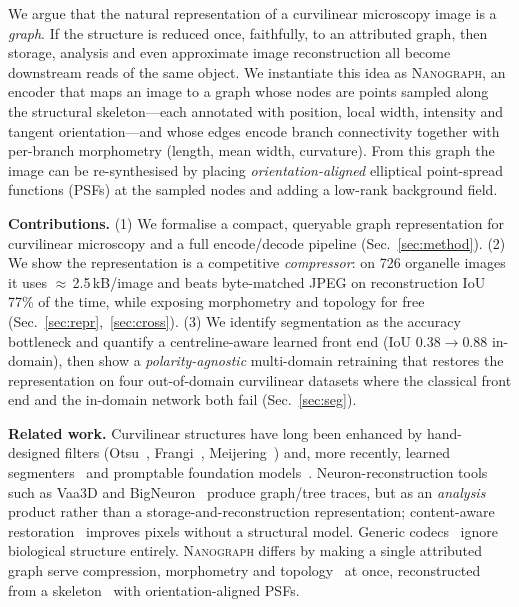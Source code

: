 \documentclass[runningheads]{llncs}
\newcommand{\method}{\textsc{Nanograph}\xspace}
\begin{document}
We argue that the natural representation of a curvilinear microscopy image is a
\emph{graph}. If the structure is reduced once, faithfully, to an attributed
graph, then storage, analysis and even approximate image reconstruction all
become downstream reads of the same object. We instantiate this idea as
\method, an encoder that maps an image to a graph whose nodes are points sampled
along the structural skeleton---each annotated with position, local width,
intensity and tangent orientation---and whose edges encode branch connectivity
together with per-branch morphometry (length, mean width, curvature). From this
graph the image can be re-synthesised by placing \emph{orientation-aligned}
elliptical point-spread functions (PSFs) at the sampled nodes and adding a
low-rank background field.

\noindent\textbf{Contributions.}
(1) We formalise a compact, queryable graph representation for curvilinear
microscopy and a full encode/decode pipeline (Sec.~\ref{sec:method}).
(2) We show the representation is a competitive \emph{compressor}: on 726
organelle images it uses $\approx$\,2.5\,kB/image and beats byte-matched JPEG on
reconstruction IoU 77\% of the time, while exposing morphometry and topology for
free (Sec.~\ref{sec:repr},~\ref{sec:cross}).
(3) We identify segmentation as the accuracy bottleneck and quantify a
centreline-aware learned front end (IoU $0.38\!\to\!0.88$ in-domain), then show
a \emph{polarity-agnostic} multi-domain retraining that restores the
representation on four out-of-domain curvilinear datasets where the classical
front end and the in-domain network both fail (Sec.~\ref{sec:seg}).

\noindent\textbf{Related work.}
Curvilinear structures have long been enhanced by hand-designed filters
(Otsu~\cite{otsu}, Frangi~\cite{frangi}, Meijering~\cite{meijering}) and, more
recently, learned segmenters~\cite{unet,cldice} and promptable foundation
models~\cite{sam}. Neuron-reconstruction tools such as Vaa3D and
BigNeuron~\cite{vaa3d,bigneuron} produce graph/tree traces, but as an
\emph{analysis} product rather than a storage-and-reconstruction representation;
content-aware restoration~\cite{care} improves pixels without a structural
model. Generic codecs~\cite{jpeg} ignore biological structure entirely.
\method differs by making a single attributed graph serve compression,
morphometry and topology~\cite{persistenthomology} at once, reconstructed from a
skeleton~\cite{lee} with orientation-aligned PSFs.

\end{document}
